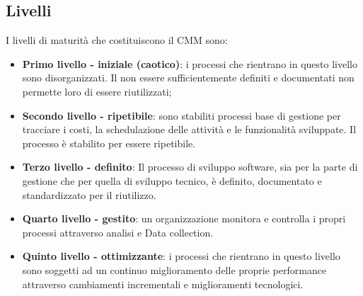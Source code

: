 \documentclass[PdQ.tex]{subfiles}
\begin{document}
	\subsection{Livelli}
	I livelli di maturità che costituiscono il CMM sono:
	\begin{itemize}
		\item \textbf{Primo livello - iniziale (caotico)}: i processi che rientrano in questo livello sono disorganizzati. Il non essere sufficientemente definiti e documentati non permette loro di essere riutilizzati;
		\item \textbf{Secondo livello - ripetibile}:
		sono stabiliti processi base di gestione per tracciare i costi, la schedulazione delle attività e le funzionalità sviluppate. Il processo è stabilito per essere ripetibile.
		\item \textbf{Terzo livello - definito}: Il processo di sviluppo software, sia per la parte di gestione che per quella di sviluppo tecnico, è definito, documentato e standardizzato per il riutilizzo.
		\item \textbf{Quarto livello - gestito}: un organizzazione monitora e controlla i propri processi attraverso analisi e Data collection.
		\item \textbf{Quinto livello - ottimizzante}: i processi che rientrano in questo livello sono soggetti ad un continuo miglioramento delle proprie
		performance attraverso cambiamenti incrementali e miglioramenti tecnologici.
	\end{itemize}
\end{document}
